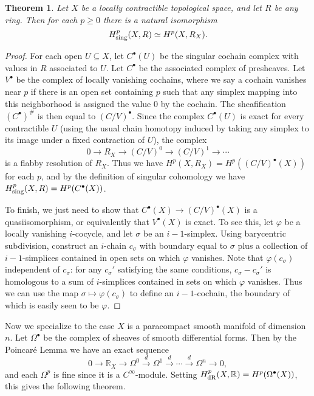 \documentclass[letterpaper,11pt]{article}
\newtheorem{thm}{Theorem}
\theoremstyle{definition}
\theoremstyle{remark}
\begin{document}
\begin{thm} Let $X$ be a locally contractible topological space, and let $R$ be any ring. Then for each $p \ge 0$ there is a natural isomorphism
\[
H^p_{\rm sing}(X,R) \simeq H^p(X,R_X).
\]
\end{thm}
\begin{proof} For each open $U\subseteq X$, let $C^\bullet(U)$ be the singular cochain complex with values in $R$ associated to $U$. Let $C^\bullet$ be the associated complex of presheaves. Let $V^\bullet$ be the complex of locally vanishing cochains, where we say a cochain vanishes near $p$ if there is an open set containing $p$ such that any simplex mapping into this neighborhood is assigned the value $0$ by the cochain. The sheafification $(C^\bullet)^\#$ is then equal to $(C/V)^\bullet$. Since the complex $C^\bullet(U)$ is exact for every contractible $U$ (using the usual chain homotopy induced by taking any simplex to its image under a fixed contraction of $U$), the complex
\[
0 \rightarrow R_X \rightarrow (C/V)^0 \rightarrow (C/V)^1 \rightarrow \cdots
\]
is a flabby resolution of $R_X$. Thus we have $H^p(X,R_X) = H^p((C/V)^\bullet(X))$ for each $p$, and by the definition of singular cohomology we have $H^p_{\rm sing}(X,R) = H^p(C^\bullet(X))$.

To finish, we just need to show that $C^\bullet(X) \rightarrow (C/V)^\bullet(X)$ is a quasiisomorphism, or equivalently that $V^\bullet(X)$ is exact. To see this, let $\varphi$ be a locally vanishing $i$-cocycle, and let $\sigma$ be an $i-1$-simplex. Using barycentric subdivision, construct an $i$-chain $c_\sigma$ with boundary equal to $\sigma$ plus a collection of $i-1$-simplices contained in open sets on which $\varphi$ vanishes. Note that $\varphi(c_\sigma)$ independent of $c_\sigma$: for any $c_\sigma'$ satisfying the same conditions, $c_\sigma-c_\sigma'$ is homologous to a sum of $i$-simplices contained in sets on which $\varphi$ vanishes. Thus we can use the map $\sigma \mapsto \varphi(c_\sigma)$ to define an $i-1$-cochain, the boundary of which is easily seen to be $\varphi$.
\end{proof}

Now we specialize to the case $X$ is a paracompact smooth manifold of dimension $n$. Let $\Omega^\bullet$ be the complex of sheaves of smooth differential forms. Then by the Poincar\'{e} Lemma we have an exact sequence
\[
0 \rightarrow \mathbb{R}_X \rightarrow \Omega^0 \stackrel{d}{\rightarrow} \Omega^1 \stackrel{d}{\rightarrow} \cdots \stackrel{d}{\rightarrow} \Omega^n \rightarrow 0,
\]
and each $\Omega^p$ is fine since it is a $C^\infty$-module. Setting $H^p_{\rm dR}(X,\mathbb{R}) = H^p(\Omega^\bullet(X))$, this gives the following theorem.
\end{document}
